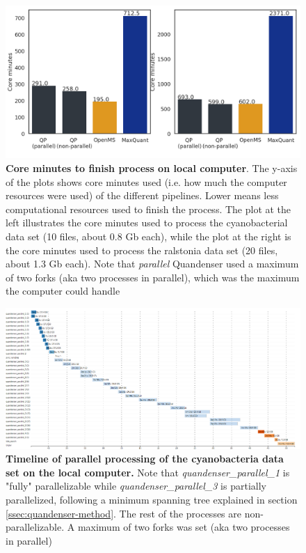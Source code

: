 \begin{figure}[H]
  \includegraphics[width=\linewidth]{results/times_core.png}
  \caption{\textbf{Core minutes to finish process on local computer}. The y-axis of the plots shows core minutes used (i.e. how much the computer resources were used) of the different pipelines. Lower means less computational resources used to finish the process. The plot at the left illustrates the core minutes used to process the cyanobacterial data set (10 files, about 0.8 Gb each), while the plot at the right is the core minutes used to process the ralstonia data set (20 files, about 1.3 Gb each). Note that \textit{parallel} Quandenser used a maximum of two forks (aka two processes in parallel), which was the maximum the computer could handle}
  \label{fig:processing-local-cores}
\end{figure}


\begin{figure}[H]
  \includegraphics[width=\linewidth]{results/timeline-local.png}
  \caption{\textbf{Timeline of parallel processing of the cyanobacteria data set on the local computer.} Note that \textit{quandenser\_parallel\_1} is "fully" parallelizable while \textit{quandenser\_parallel\_3} is partially parallelized, following a minimum spanning tree explained in section \ref{ssec:quandenser-method}. The rest of the processes are non-parallelizable. A maximum of two forks was set (aka two processes in parallel)}
  \label{fig:timeline-local}
\end{figure}

